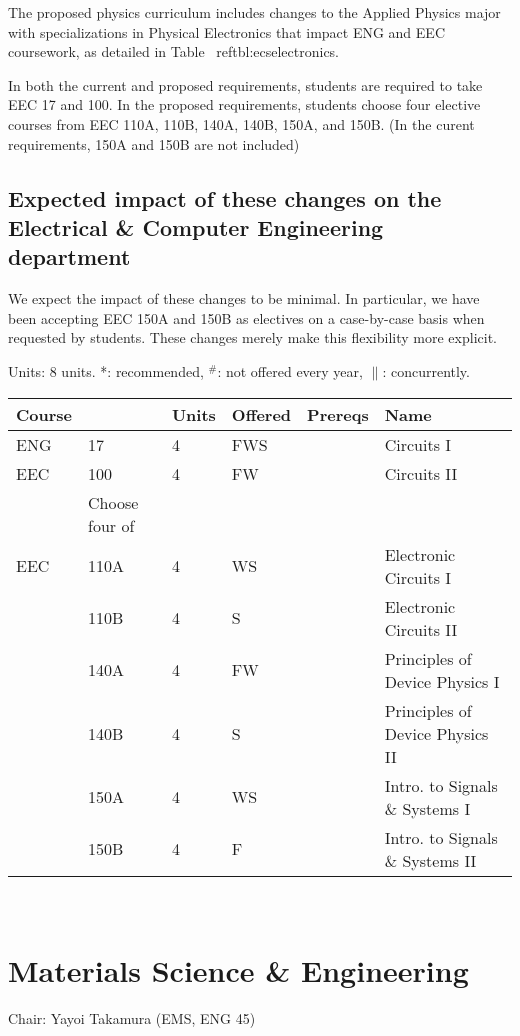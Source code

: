 \documentclass[12pt]{article}
\begin{document}
The proposed physics curriculum includes changes to the Applied
Physics major with specializations in Physical Electronics that impact
ENG and EEC coursework, as detailed in Table~ ref{tbl:ecselectronics}.

In both the current and proposed requirements, students are required
to take EEC 17 and 100.  In the proposed requirements, students choose
four elective courses from EEC 110A, 110B, 140A, 140B, 150A, and 150B.
(In the curent requirements, 150A and 150B are not included)

\subsection{Expected impact of these changes on the Electrical \& Computer Engineering department}

We expect the impact of these changes to be minimal.  In particular,
we have been accepting EEC 150A and 150B as electives on a
case-by-case basis when requested by students.  These changes merely
make this flexibility more explicit.

\vskip 0.25cm
\noindent
Units:  8 units. *: recommended, $^\#$: not offered every year, $\parallel$: concurrently.\\
\begin{tabular}{|llllll|}
\hline
Course & & Units & Offered & Prereqs & Name \\
\hline
ENG & 17     & 4 & FWS & & Circuits I\\
EEC & 100    & 4 & FW & & Circuits II\\
\hline
\hline
    & Choose four of & & & & \\
\hline
EEC & 110A  & 4 & WS & & Electronic Circuits I \\
    & 110B  & 4 & S  & & Electronic Circuits II\\
    & 140A  & 4 & FW & & Principles of Device Physics I\\
    & 140B  & 4 & S  & & Principles of Device Physics II\\
    & 150A  & 4 & WS & & Intro. to Signals \& Systems I\\
    & 150B  & 4 & F  & & Intro. to Signals \& Systems II\\
\hline
\end{tabular}\\



\newpage
\section{Materials Science \& Engineering}
Chair: Yayoi Takamura (EMS, ENG 45)
\end{document}
